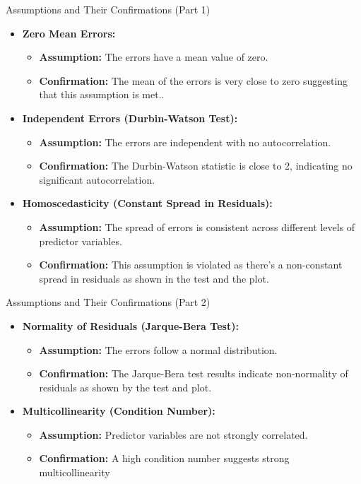 \documentclass{beamer}
\begin{document}
\begin{frame}{Assumptions and Their Confirmations (Part 1)}
\begin{itemize}
\item \textbf{Zero Mean Errors:}
   \begin{itemize}
   \item \textbf{Assumption:} The errors have a mean value of zero.
   \item \textbf{Confirmation:} The mean of the errors is very close to zero suggesting that this assumption is met..
   \end{itemize}

\item \textbf{Independent Errors (Durbin-Watson Test):}
   \begin{itemize}
   \item \textbf{Assumption:} The errors are independent with no autocorrelation.
   \item \textbf{Confirmation:} The Durbin-Watson statistic is close to 2, indicating no significant autocorrelation.
   \end{itemize}

\item \textbf{Homoscedasticity (Constant Spread in Residuals):}
   \begin{itemize}
   \item \textbf{Assumption:} The spread of errors is consistent across different levels of predictor variables.
   \item \textbf{Confirmation:} This assumption is violated as there's a non-constant spread in residuals as shown in the test and the plot.
   \end{itemize}
\end{itemize}
\end{frame}

\begin{frame}{Assumptions and Their Confirmations (Part 2)}
\begin{itemize}
\item \textbf{Normality of Residuals (Jarque-Bera Test):}
   \begin{itemize}
   \item \textbf{Assumption:} The errors follow a normal distribution.
   \item \textbf{Confirmation:} The Jarque-Bera test results indicate non-normality of residuals as shown by the test and plot.
   \end{itemize}

\item \textbf{Multicollinearity (Condition Number):}
   \begin{itemize}
   \item \textbf{Assumption:} Predictor variables are not strongly correlated.
   \item \textbf{Confirmation:} A high condition number suggests strong multicollinearity
\end{itemize}
\end{itemize}

\end{frame}
\end{document}
